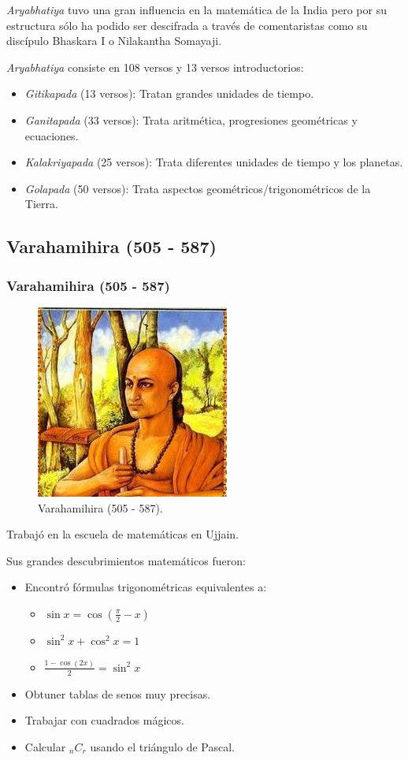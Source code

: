 \documentclass[12pt, aspectratio=169]{beamer} %
\begin{document}
		\begin{frame}
			\textit{Aryabhatiya} tuvo una gran influencia en la matemática de la India pero por su estructura sólo ha
			podido ser descifrada a través de comentaristas como su discípulo Bhaskara I o Nilakantha Somayaji.
								
						
			\textit{Aryabhatiya} consiste en 108 versos y 13 versos introductorios:
			\begin{itemize}
				\item \textit{Gitikapada} (13 versos):  Tratan grandes unidades de tiempo.
				\item \textit{Ganitapada} (33 versos): Trata aritmética, progresiones geométricas y ecuaciones.
				\item \textit{Kalakriyapada} (25 versos): Trata diferentes unidades de tiempo y los planetas.
				\item \textit{Golapada} (50 versos): Trata aspectos geométricos/trigonométricos de la Tierra.
			\end{itemize}
		\end{frame}

	\subsection{Varahamihira (505 - 587)}
		\begin{frame}
			\frametitle{Varahamihira (505 - 587)}
			\begin{figure}
				\centering
				\includegraphics[width = .3\linewidth]{varahamihira.jpg}
				\caption{Varahamihira (505 - 587).}
			\end{figure}
		\end{frame}

		\begin{frame}
			Trabajó en la escuela de matemáticas en Ujjain.
			
			Sus grandes descubrimientos matemáticos fueron:
			\begin{itemize}
				\item Encontró fórmulas trigonométricas equivalentes a:
				\begin{itemize}
					\item $\displaystyle \sin x = \cos \left(\frac{\pi}{2} - x \right)$
					\item $\displaystyle \sin^2 x + \cos^2 x = 1$
					\item $\displaystyle \frac{1 - \cos(2x)}{2} = \sin^2 x$
				\end{itemize}
				\item Obtuner tablas de senos muy precisas.
				\item Trabajar con cuadrados mágicos.
				\item Calcular $_n C_r$ usando el triángulo de Pascal.
			\end{itemize}
		\end{frame}
\end{document}
